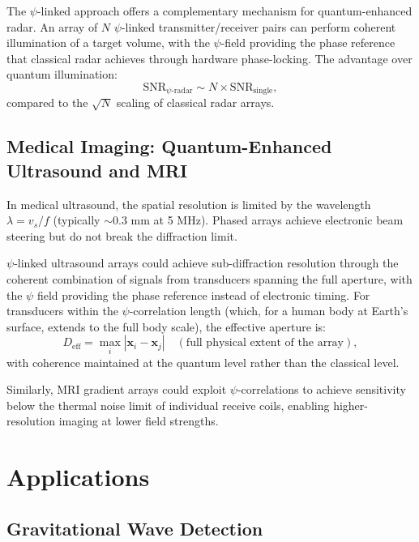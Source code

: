 \documentclass[12pt,a4paper]{article}
\theoremstyle{remark}
\begin{document}
The $\psi$-linked approach offers a complementary mechanism for
quantum-enhanced radar. An array of $N$ $\psi$-linked transmitter/receiver
pairs can perform coherent illumination of a target volume, with the
$\psi$-field providing the phase reference that classical radar achieves
through hardware phase-locking. The advantage over quantum illumination:
\begin{equation}
\text{SNR}_{\psi\text{-radar}} \sim N \times \text{SNR}_{\text{single}},
\end{equation}
compared to the $\sqrt{N}$ scaling of classical radar arrays.

\subsection{Medical Imaging: Quantum-Enhanced Ultrasound and MRI}

In medical ultrasound, the spatial resolution is limited by the wavelength
$\lambda = v_s/f$ (typically $\sim 0.3$ mm at 5 MHz). Phased arrays achieve
electronic beam steering but do not break the diffraction limit.

$\psi$-linked ultrasound arrays could achieve sub-diffraction resolution
through the coherent combination of signals from transducers spanning the
full aperture, with the $\psi$ field providing the phase reference instead of
electronic timing. For transducers within the $\psi$-correlation length
(which, for a human body at Earth's surface, extends to the full
body scale), the effective aperture is:
\begin{equation}
D_{\text{eff}} = \max_i |\mathbf{x}_i - \mathbf{x}_j| \quad
(\text{full physical extent of the array}),
\end{equation}
with coherence maintained at the quantum level rather than the classical
level.

Similarly, MRI gradient arrays could exploit $\psi$-correlations to achieve
sensitivity below the thermal noise limit of individual receive coils,
enabling higher-resolution imaging at lower field strengths.


\section{Applications}\label{sec:applications}

\subsection{Gravitational Wave Detection}\label{sec:gw-detection}
\end{document}
